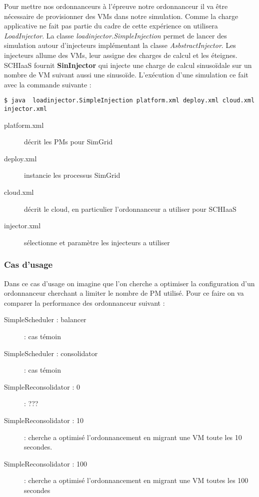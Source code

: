 \documentclass[parallelisme]{compas2017}
\begin{document}
Pour mettre nos ordonnanceurs à l'épreuve notre ordonnanceur il va être
nécessaire de provisionner des VMs dans notre simulation. Comme la charge
applicative ne fait pas partie du cadre de cette expérience on utilisera
\emph{LoadInjector}. La classe \emph{loadinjector.SimpleInjection} permet de
lancer des simulation autour d'injecteurs implémentant la classe
\emph{AsbstractInjector}. Les injecteurs allume des VMs, leur assigne des
charges de calcul et les éteignes. SCHIaaS fournit \textbf{SinInjector} qui
injecte une charge de calcul sinusoïdale sur un nombre de VM suivant aussi une
sinusoïde. L'exécution d'une simulation ce fait avec la commande suivante : 
\begin{verbatim}
$ java  loadinjector.SimpleInjection platform.xml deploy.xml cloud.xml
injector.xml
\end{verbatim}
\begin{description}
	\item[platform.xml] décrit les PMs pour SimGrid
	\item[deploy.xml] instancie les processus SimGrid
	\item[cloud.xml] décrit le cloud, en particulier l'ordonnanceur a
		utiliser pour SCHIaaS
	\item[injector.xml] sélectionne et paramètre les injecteurs a utiliser
\end{description}

\subsubsection{Cas d'usage}

Dans ce cas d'usage on imagine que l'on cherche a optimiser la configuration d'un
ordonnanceur cherchant a limiter le nombre de PM utilisé. Pour ce faire on va
comparer la performance des ordonnanceur suivant : 
\begin{description}
	\item[SimpleScheduler : balancer] : cas témoin
	\item[SimpleScheduler : consolidator] : cas témoin
	\item[SimpleReconsolidator : 0 ] : ???
	\item[SimpleReconsolidator : 10] : cherche a optimisé l'ordonnancement
		en migrant une VM toute les 10 secondes.
	\item[SimpleReconsolidator : 100] : cherche a optimisé l'ordonnancement
		en migrant une VM toutes les 100 secondes
\end{description}
\end{document}
